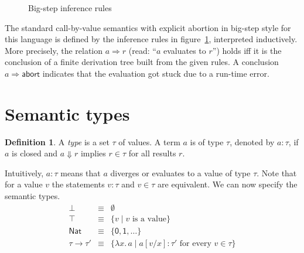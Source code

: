 \documentclass[12pt,a4paper]{article}
\theoremstyle{definition}
\newtheorem{definition}{Definition}
\theoremstyle{plain}
\newcommand{\abort}{\ensuremath{\mathsf{abort}}}
\newcommand{\abstr}[2]{\ensuremath{\lambda{#1}.\,{#2}}}
\newcommand{\app}[2]{\ensuremath{{#1}\,{#2}}}
\newcommand{\Nat}{\ensuremath{\mathsf{Nat}}}
\begin{document}
\begin{figure}[htb]
  \centering
  \caption{Big-step inference rules}
  \label{fig:Big_step_inference_rules}
\end{figure}

The standard call-by-value semantics with explicit abortion in big-step style for this language
is defined by the inference rules in figure~\ref{fig:Big_step_inference_rules}, interpreted inductively.
More precisely, the relation $a \Rightarrow r$ (read: ``$a$ evaluates to $r$'') holds iff
it is the conclusion of a finite derivation tree built from the given rules. A conclusion
$a \Rightarrow \abort$ indicates that the evaluation got stuck due to a run-time error.


\section{Semantic types}
\label{sec:Semantic_types}

\begin{definition} \label{def:Types}
  A \emph{type} is a set $\tau$ of values. A term $a$ is of type $\tau$, denoted by $a : \tau$,
  if $a$ is closed and $a \Downarrow r$ implies $r \in \tau$ for all results $r$.
\end{definition}

Intuitively, $a : \tau$ means that $a$ diverges or evaluates to a value of type $\tau$. Note that
for a value $v$ the statements $v : \tau$ and $v \in \tau$ are equivalent.
We can now specify the semantic types.
\[\begin{array}{rcl}
  \bot &\equiv& \emptyset \\
  \top &\equiv& \{ v \mid \text{$v$ is a value} \} \\
  \Nat &\equiv& \{ \mathsf{0},\mathsf{1},\ldots \} \\
  \tau \to \tau' &\equiv& \{ \abstr{x}{a} \mid \text{$a[v/x] : \tau'$ for every $v \in \tau$} \} \\
\end{array}\]
\end{document}
